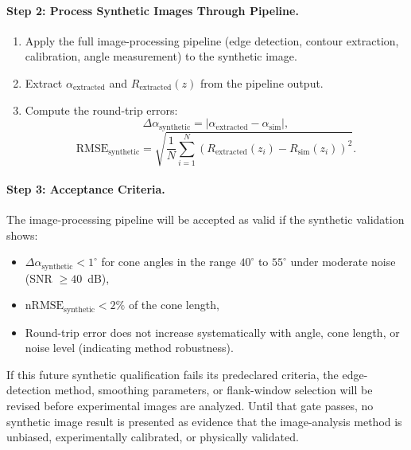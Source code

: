 \paragraph{Step 2: Process Synthetic Images Through Pipeline.}
\begin{enumerate}
    \item Apply the full image-processing pipeline (edge detection, contour extraction, calibration, angle measurement) to the synthetic image.
    \item Extract $\alpha_{\mathrm{extracted}}$ and $R_{\mathrm{extracted}}(z)$ from the pipeline output.
    \item Compute the round-trip errors:
    \begin{equation}
    \Delta\alpha_{\mathrm{synthetic}} = |\alpha_{\mathrm{extracted}} - \alpha_{\mathrm{sim}}|,
    \end{equation}
    \begin{equation}
    \mathrm{RMSE}_{\mathrm{synthetic}} = \sqrt{\frac{1}{N}\sum_{i=1}^{N}\left(R_{\mathrm{extracted}}(z_i) - R_{\mathrm{sim}}(z_i)\right)^2}.
    \end{equation}
\end{enumerate}

\paragraph{Step 3: Acceptance Criteria.}
The image-processing pipeline will be accepted as valid if the synthetic validation shows:
\begin{itemize}
    \item $\Delta\alpha_{\mathrm{synthetic}} < 1^{\circ}$ for cone angles in the range $40^{\circ}$ to $55^{\circ}$ under moderate noise (SNR $\geq 40$~dB),
    \item $\mathrm{nRMSE}_{\mathrm{synthetic}} < 2\%$ of the cone length,
    \item Round-trip error does not increase systematically with angle, cone length, or noise level (indicating method robustness).
\end{itemize}

If this future synthetic qualification fails its predeclared criteria, the edge-detection method, smoothing parameters, or flank-window selection will be revised before experimental images are analyzed. Until that gate passes, no synthetic image result is presented as evidence that the image-analysis method is unbiased, experimentally calibrated, or physically validated.

